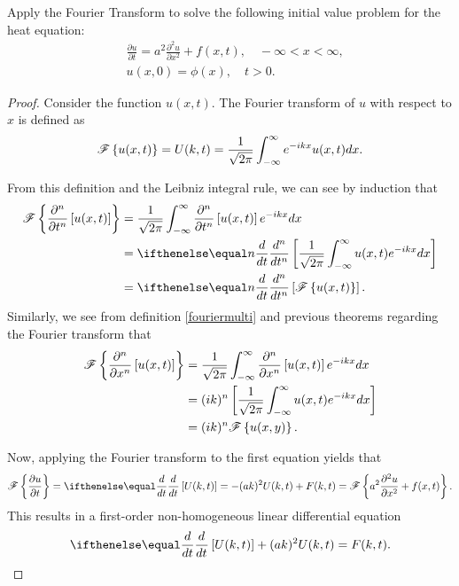 \begin{problem}{5}
  Apply the Fourier Transform to solve the following initial value problem for the heat equation:
  \begin{align*}
    &\frac{\partial u}{\partial t} = a^2 \frac{\partial^2 u}{\partial x^2} + f(x, t), \quad -\infty < x < \infty,\\
    &u(x, 0) = \phi(x), \quad t >0.
  \end{align*}
\end{problem}

\begin{proof}
  Consider the function $u(x, t)$. The Fourier transform
  of $u$ with respect to $x$ is defined as
  \begin{align}\label{fouriermulti}
    \mathscr{F}\left\{ {u(x, t)} \right\} = U(k, t) = \frac{1}{\sqrt{2\pi}}\int_{-\infty}^{\infty} e^{-ikx} u(x, t) dx.
  \end{align}

  From this definition and the Leibniz integral rule, we can see by induction that
  \begin{align}\label{partialy}
    \fourier{\frac{\partial^n }{\partial t^n }\left[u(x,t)\right]}
    &= \frac{1}{\sqrt{2\pi}}\int_{-\infty}^\infty \frac{\partial^n}{ \partial t^n}\left[ u(x, t)\right] e^{-ikx} dx \notag \\
    &= \der{t}{n}\left[\frac{1}{\sqrt{2\pi}} \int_{-\infty}^\infty u(x, t) e^{-ikx} dx \right] \notag \\
    &= \der{t}{n}\left[\fourier{u(x,t)}\right].
  \end{align}
  Similarly, we see from definition \eqref{fouriermulti} and previous
  theorems regarding the Fourier transform that
  \begin{align}\label{partialx}
    \mathscr{F}\left\{ {\frac{\partial^n}{\partial x^n}\left[u(x, t)\right]} \right\}
    &= \frac{1}{\sqrt{2\pi}}\int_{-\infty}^\infty \frac{\partial^n}{\partial x^n}\left[u(x, t)\right] e^{-ikx} dx \notag \\
    &= (ik)^n \left[\frac{1}{\sqrt{2\pi}} \int_{-\infty}^\infty u(x,t)e^{-ikx} dx \right] \notag \\
    &= (ik)^n \mathscr{F}\left\{ {u(x,y)} \right\}.
  \end{align}

  Now, applying the Fourier transform to the first equation yields that
  \begin{align*}
    \fourier{\frac{\partial u}{\partial t}} = \der{t}{}\left[U(k, t)\right] = -(ak)^2 U(k,t) + F(k, t) =  \fourier{a^2 \frac{\partial^2 u}{\partial x^2} + f(x, t)}.
  \end{align*}
  This results in a first-order non-homogeneous linear differential equation
  \begin{align*}
    \der{t}{}\left[U(k, t)\right] + (ak)^2 U(k,t) = F(k, t).
  \end{align*}


\end{proof}

